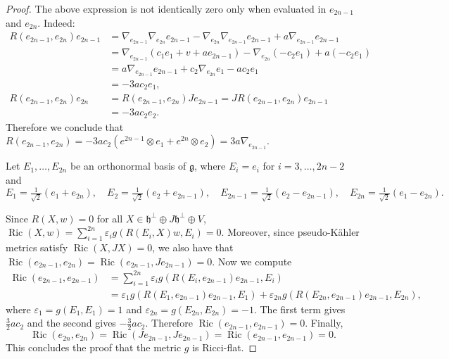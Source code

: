 \documentclass[10pt,a4paper]{amsart}
\DeclareMathOperator{\Ric}{Ric}
\newcommand{\frg}{\mathfrak{g}}
\newcommand{\frh}{\mathfrak{h}}
\begin{document}
\begin{proof}
    The above expression is not identically zero only when evaluated in $e_{2n-1}$ and $e_{2n}$. Indeed: \begin{align*}
        R(e_{2n-1},e_{2n})e_{2n-1}&=\nabla_{e_{2n-1}}\nabla_{e_{2n}}e_{2n-1}-\nabla_{e_{2n}}\nabla_{e_{2n-1}}e_{2n-1}+a\nabla_{e_{2n-1}}e_{2n-1}\\
        &=\nabla_{e_{2n-1}}(c_1e_1+v+ae_{2n-1})-\nabla_{e_{2n}}(-c_2e_1)+a(-c_2e_1)\\
        &=a\nabla_{e_{2n-1}}e_{2n-1}+c_2\nabla_{e_{2n}}e_1-ac_2e_1\\
        &=-3ac_2e_1,\\
        R(e_{2n-1},e_{2n})e_{2n}&=R(e_{2n-1},e_{2n})Je_{2n-1}=JR(e_{2n-1},e_{2n})e_{2n-1}\\
        &=-3ac_2e_2.
    \end{align*}
    Therefore we conclude that $R(e_{2n-1},e_{2n})=-3ac_2(e^{2n-1}\otimes e_1+e^{2n}\otimes e_2)=3a\nabla_{e_{2n-1}}$.\medskip

    Let $E_1,\ldots,E_{2n}$ be an orthonormal basis of $\frg$, where $E_i=e_i$ for $i=3,\ldots,2n-2$ and $$E_1=\tfrac{1}{\sqrt{2}}(e_1+e_{2n}),\quad E_2=\tfrac{1}{\sqrt{2}}(e_2+e_{2n-1}),\quad E_{2n-1}=\tfrac{1}{\sqrt{2}}(e_2-e_{2n-1}),\quad E_{2n}=\tfrac{1}{\sqrt{2}}(e_1-e_{2n}).$$

    Since $R(X,w)=0$ for all $X\in\frh^\perp\oplus J\frh^\perp\oplus V$, $\Ric(X,w)=\sum_{i=1}^{2n}\varepsilon_ig(R(E_i,X)w,E_i)=0$. Moreover, since pseudo-K\"ahler metrics satisfy $\Ric(X,JX)=0$, we also have that $\Ric(e_{2n-1},e_{2n})=\Ric(e_{2n-1},Je_{2n-1})=0$. Now we compute \begin{align*}
        \Ric(e_{2n-1},e_{2n-1})&=\sum_{i=1}^{2n}\varepsilon_ig(R(E_i,e_{2n-1})e_{2n-1},E_i)\\
        &=\varepsilon_1g(R(E_1,e_{2n-1})e_{2n-1},E_1)+\varepsilon_{2n}g(R(E_{2n},e_{2n-1})e_{2n-1},E_{2n}),
    \end{align*} where $\varepsilon_1=g(E_1,E_1)=1$ and $\varepsilon_{2n}=g(E_{2n},E_{2n})=-1$. The first term gives $\frac{3}{2}ac_2$ and the second gives $-\frac{3}{2}ac_2$. Therefore $\Ric(e_{2n-1},e_{2n-1})=0$. Finally,
    \[\Ric(e_{2n},e_{2n})=\Ric(Je_{2n-1},Je_{2n-1})=\Ric(e_{2n-1},e_{2n-1})=0.\] This concludes the proof that the metric $g$ is Ricci-flat.
\end{proof}
\end{document}
